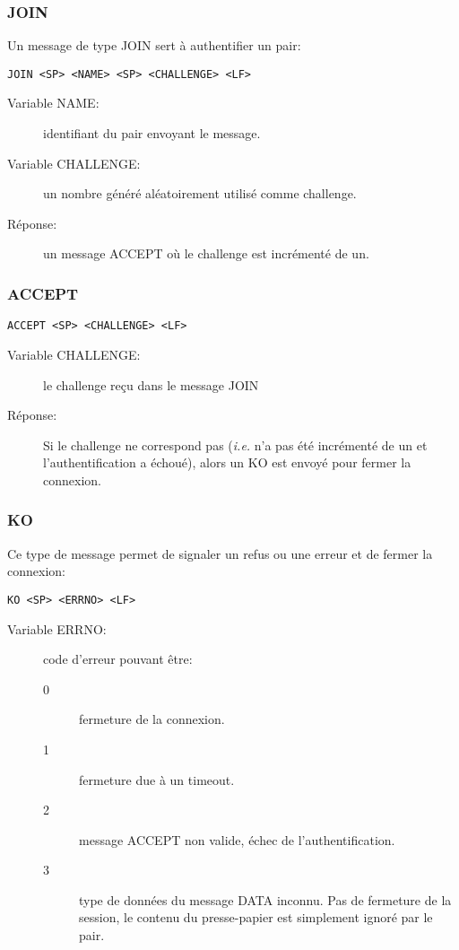 \subsubsection*{JOIN}
Un message de type JOIN sert à authentifier un pair:
\begin{verbatim}
JOIN <SP> <NAME> <SP> <CHALLENGE> <LF>
\end{verbatim}
\begin{description}
\item[Variable NAME:] identifiant du pair envoyant le message.
\item[Variable CHALLENGE:] un nombre généré aléatoirement utilisé comme
  challenge.
\item[Réponse:] un message ACCEPT où le challenge est incrémenté de un.
\end{description}

\hrulefill

\subsubsection*{ACCEPT}
\begin{verbatim}
ACCEPT <SP> <CHALLENGE> <LF>
\end{verbatim}
\begin{description}
\item[Variable CHALLENGE:] le challenge reçu dans le message JOIN
\item[Réponse:] Si le challenge ne correspond pas (\emph{i.e.} n'a pas été
  incrémenté de un et l'authentification a échoué), alors un KO est envoyé
  pour fermer la connexion.
\end{description}

\hrulefill

\subsubsection*{KO}
Ce type de message permet de signaler un refus ou une erreur et de fermer
la connexion:
\begin{verbatim}
KO <SP> <ERRNO> <LF>
\end{verbatim}
\begin{description}
\item[Variable ERRNO:] code d'erreur pouvant être:
  \begin{description}
  \item[0] fermeture de la connexion.
  \item[1] fermeture due à un timeout.
  \item[2] message ACCEPT non valide, échec de l'authentification.
  \item[3] type de données du message DATA inconnu. Pas de fermeture de la
    session, le contenu du presse-papier est simplement ignoré par le pair.
  \end{description}
\end{description}

